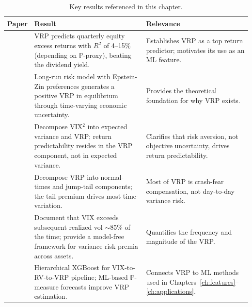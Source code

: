 \begin{table}[htbp]
\centering
\caption{Key results referenced in this chapter.}
\label{tab:ch09-key-results}
\begin{tabular}{@{} p{4cm} p{5.5cm} p{4.5cm} @{}}
\toprule
\textbf{Paper} & \textbf{Result} & \textbf{Relevance} \\
\midrule
\citet{BTZ2009} &
VRP predicts quarterly equity excess returns with $R^2$ of 4--15\% (depending on $\mathbb{P}$-proxy), beating the dividend yield. &
Establishes VRP as a top return predictor; motivates its use as an ML feature. \\[6pt]

\citet{DrechslerYaron2011} &
Long-run risk model with Epstein-Zin preferences generates a positive VRP in equilibrium through time-varying economic uncertainty. &
Provides the theoretical foundation for why VRP exists. \\[6pt]

\citet{BekaertHoerova2014} &
Decompose VIX$^2$ into expected variance and VRP; return predictability resides in the VRP component, not in expected variance. &
Clarifies that risk aversion, not objective uncertainty, drives return predictability. \\[6pt]

\citet{BollerslevTodorov2015} &
Decompose VRP into normal-times and jump-tail components; the tail premium drives most time-variation. &
Most of VRP is crash-fear compensation, not day-to-day variance risk. \\[6pt]

\citet{Carr2009} &
Document that VIX exceeds subsequent realized vol $\sim$85\% of the time; provide a model-free framework for variance risk premia across assets. &
Quantifies the frequency and magnitude of the VRP. \\[6pt]

\citet{Fouhy2024} &
Hierarchical XGBoost for VIX-to-RV-to-VRP pipeline; ML-based $\mathbb{P}$-measure forecasts improve VRP estimation. &
Connects VRP to ML methods used in Chapters~\ref{ch:features}--\ref{ch:applications}. \\
\bottomrule
\end{tabular}
\end{table}
